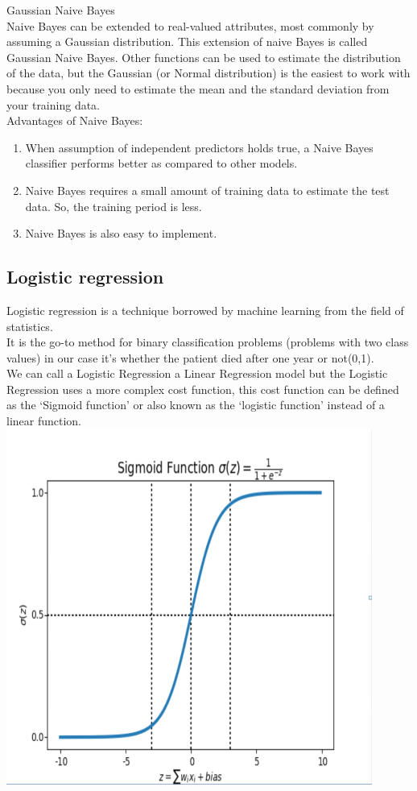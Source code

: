 \documentclass[a4paper, 11pt, oneside]{article} %
\begin{document}
Gaussian Naive Bayes\\
Naive Bayes can be extended to real-valued attributes, most commonly by assuming a Gaussian distribution.
This extension of naive Bayes is called Gaussian Naive Bayes. Other functions can be used to estimate the distribution of the data, but the Gaussian (or Normal distribution) is the easiest to work with because you only need to estimate the mean and the standard deviation from your training data.\\

Advantages of Naive Bayes:
\begin{enumerate}
\item When assumption of independent predictors holds true, a Naive Bayes classifier performs better as compared to other models.

\item Naive Bayes requires a small amount of training data to estimate the test data. So, the training period is less.

\item Naive Bayes is also easy to implement.
\end{enumerate}
\newpage



\subsection{Logistic regression}   
Logistic regression is a technique borrowed by machine learning from the field of statistics.\\
It is the go-to method for binary classification problems (problems with two class values) in our case it’s whether the patient died after one year or not(0,1).\\
We can call a Logistic Regression a Linear Regression model but the Logistic Regression uses a more complex cost function, this cost function can be defined as the ‘Sigmoid function’ or also known as the ‘logistic function’ instead of a linear function.\cite{machinelearningmastery} \\


\includegraphics[width=12cm, height=5 cm]{figures/Sigmoid}
\end{document}
